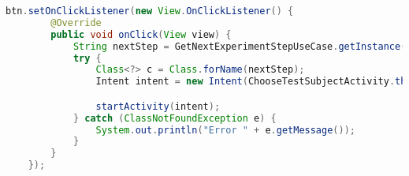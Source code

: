 
\begin{lstlisting}[language=java,label=activity_call_on_btn_press,lineskip={0pt}, caption=Activity Call on Button Press, basicstyle=\scriptsize, captionpos=b]
    btn.setOnClickListener(new View.OnClickListener() {
        @Override
        public void onClick(View view) {
            String nextStep = GetNextExperimentStepUseCase.getInstance().getNextExperimentStep();
            try {
                Class<?> c = Class.forName(nextStep);
                Intent intent = new Intent(ChooseTestSubjectActivity.this, c);

                startActivity(intent);
            } catch (ClassNotFoundException e) {
                System.out.println("Error " + e.getMessage());
            }
        }
    });
\end{lstlisting}

